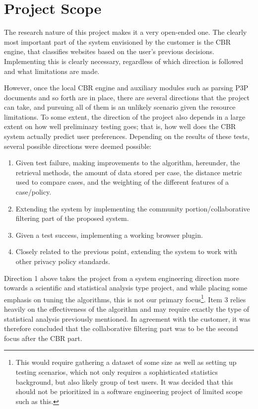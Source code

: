 \section{Project Scope}
The research nature of this project makes it a very open-ended one. The clearly most important part of the system envisioned by the customer is the CBR engine, that classifies websites based on the user's previous decisions. Implementing this is clearly necessary, regardless of which direction is followed and what limitations are made.

However, once the local CBR engine and auxiliary modules such as parsing P3P documents and so forth are in place, there are several directions that the project can take, and pursuing all of them is an unlikely scenario given the resource limitations. To some extent, the direction of the project also depends in a large extent on how well preliminary testing goes; that is, how well does the CBR system actually predict user preferences. Depending on the results of these tests, several possible directions were deemed possible:

\begin{enumerate}
\item Given test failure, making improvements to the algorithm, hereunder, the retrieval methods, the amount of data stored per case, the distance metric used to compare cases, and the weighting of the different features of a case/policy.
\item Extending the system by implementing the community portion/collaborative filtering part of the proposed system.
\item Given a test success, implementing a working browser plugin.
\item Closely related to the previous point, extending the system to work with other privacy policy standards.
\end{enumerate}

Direction 1 above takes the project from a system engineering direction more towards a scientific and statistical analysis type project, and while placing some emphasis on tuning the algorithms, this is not our primary focus\footnote{This would require gathering a dataset of some size as well as setting up testing scenarios, which not only requires a sophisticated statistics background, but also likely group of test users. It was decided that this should not be prioritized in a software engineering project of limited scope such as this.}. Item 3 relies heavily on the effectiveness of the algorithm and may require exactly the type of statistical analysis previously mentioned. In agreement with the customer, it was therefore concluded that the collaborative filtering part was to be the second focus after the CBR part. 

